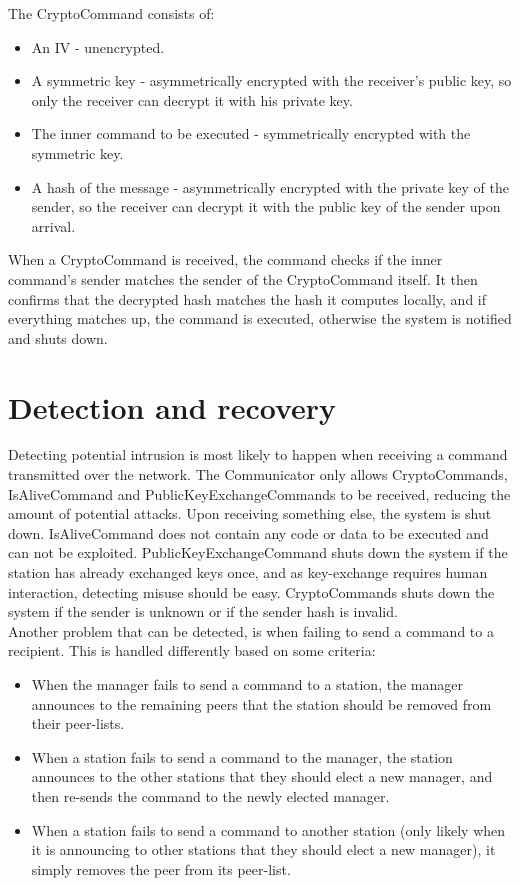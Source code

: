 \documentclass[a4paper]{report}
\begin{document}
The CryptoCommand consists of:
\begin{itemize}
\item An IV - unencrypted.
\item A symmetric key - asymmetrically encrypted with the receiver's public key, so only the receiver can decrypt it with his private key.
\item The inner command to be executed - symmetrically encrypted with the symmetric key.
\item A hash of the message - asymmetrically encrypted with the private key of the sender, so the receiver can decrypt it with the public key of the sender upon arrival.
\end{itemize}

When a CryptoCommand is received, the command checks if the inner command's sender matches the sender of the CryptoCommand itself. It then confirms that the decrypted hash matches the hash it computes locally, and if everything matches up, the command is executed, otherwise the system is notified and shuts down.

\section{Detection and recovery}
\label{sec:detection}
Detecting potential intrusion is most likely to happen when receiving a command transmitted over the network. The Communicator only allows CryptoCommands, IsAliveCommand and PublicKeyExchangeCommands to be received, reducing the amount of potential attacks. Upon receiving something else, the system is shut down.
IsAliveCommand does not contain any code or data to be executed and can not be exploited. PublicKeyExchangeCommand shuts down the system if the station has already exchanged keys once, and as key-exchange requires human interaction, detecting misuse should be easy. CryptoCommands shuts down the system if the sender is unknown or if the sender hash is invalid. \\

Another problem that can be detected, is when failing to send a command to a recipient. This is handled differently based on some criteria:

\begin{itemize}
\item When the manager fails to send a command to a station, the manager announces to the remaining peers that the station should be removed from their peer-lists.
\item When a station fails to send a command to the manager, the station announces to the other stations that they should elect a new manager, and then re-sends the command to the newly elected manager.
\item When a station fails to send a command to another station (only likely when it is announcing to other stations that they should elect a new manager), it simply removes the peer from its peer-list.
\end{itemize}
\end{document}
